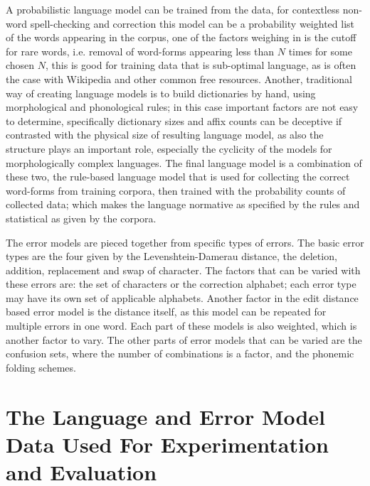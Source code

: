 \documentclass[a4paper,12pt]{article}
\begin{document}
A probabilistic language model can be trained from the data, for contextless
non-word spell-checking and correction this model can be a probability weighted
list of the words appearing in the corpus, one of the factors weighing in is
the cutoff for rare words, i.e. removal of word-forms appearing less than $N$
times for some chosen $N$, this is good for training data that is sub-optimal
language, as is often the case with Wikipedia and other common free resources.
Another, traditional way of creating language models is to build dictionaries
by hand, using morphological and phonological rules; in this case important
factors are not easy to determine, specifically dictionary sizes and affix
counts can be deceptive if contrasted with the physical size of resulting
language model, as also the structure plays an important role, especially the
cyclicity of the models for morphologically complex languages. The final
language model is a combination of these two, the rule-based language model
that is used for collecting the correct word-forms from training corpora, then
trained with the probability counts of collected data; which makes the language
normative as specified by the rules and statistical as given by the corpora.

The error models are pieced together from specific types of errors. The
basic error types are the four given by the Levenshtein-Damerau distance, the
deletion, addition, replacement and swap of character. The factors that can
be varied with these errors are: the set of characters or the correction
alphabet; each error type may have its own set of applicable alphabets.
Another factor in the edit distance based error model is the distance itself,
as this model can be repeated for multiple errors in one word. Each part
of these models is also weighted, which is another factor to vary. The other
parts of error models that can be varied are the confusion sets, where the
number of combinations is a factor, and the phonemic folding schemes.

\section{The Language and Error Model Data Used For Experimentation and
Evaluation}
\label{sec:material}
\end{document}
